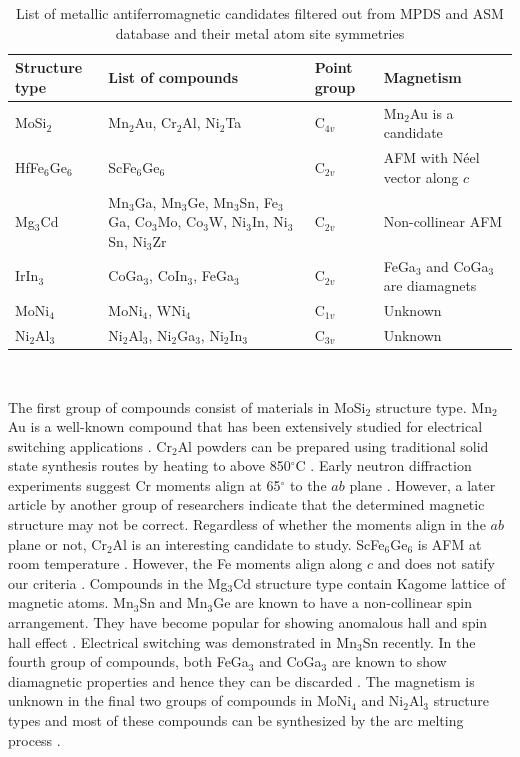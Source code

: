 \documentclass[11pt,edeposit,draftthesis]{uiucthesis2020}
\begin{document}
\begin{mainmatter}
\renewcommand{\arraystretch}{1.2}
\begin{table}
\caption{\label{tab:metallic_afm_candidates} 
List of metallic antiferromagnetic candidates filtered out from MPDS and ASM database and their metal atom site symmetries}
\centering
\begin{tabular}{>{\raggedright\arraybackslash}p{3cm}>{\raggedright\arraybackslash}p{4cm}>{\centering}p{3cm}>{\raggedright\arraybackslash}p{4cm}}
\hline\hline
\textbf{Structure type} & \textbf{List of compounds} & \textbf{Point group} & \textbf{Magnetism}\\
\hline
MoSi$_2$ & Mn$_2$Au, Cr$_2$Al, Ni$_2$Ta & C$_{4v}$ & Mn$_2$Au is a candidate\\
\hline
HfFe$_6$Ge$_6$ & ScFe$_6$Ge$_6$ & C$_{2v}$ & AFM with N\'eel vector along $c$\\
\hline
Mg$_3$Cd & Mn$_3$Ga, Mn$_3$Ge, Mn$_3$Sn, Fe$_3$Ga, Co$_3$Mo, Co$_3$W, Ni$_3$In, Ni$_3$Sn, Ni$_3$Zr & C$_{2v}$ & Non-collinear AFM\\
\hline
IrIn$_3$ & CoGa$_3$, CoIn$_3$, FeGa$_3$ & C$_{2v}$ & FeGa$_3$ and CoGa$_3$ are diamagnets\\
\hline
MoNi$_4$ & MoNi$_4$, WNi$_4$ & C$_{1v}$ & Unknown\\
\hline
Ni$_2$Al$_3$ & Ni$_2$Al$_3$, Ni$_2$Ga$_3$, Ni$_2$In$_3$ & C$_{3v}$ & Unknown\\
\hline\hline
\end{tabular}
~\\
\end{table}


The first group of compounds consist of materials in MoSi$_2$ structure type. Mn$_2$Au is a well-known compound that has been extensively studied for electrical switching applications \cite{Meinert2018,Bodnar2019}. Cr$_2$Al powders can be prepared using traditional solid state synthesis routes by heating to above 850$^\circ$C \cite{Susner2015}. Early neutron diffraction experiments suggest Cr moments align at 65$^\circ$ to the $ab$ plane \cite{Atoji1965}. However, a later article \cite{Kallel1967} by another group of researchers indicate that the determined magnetic structure may not be correct. Regardless of whether the moments align in the $ab$ plane or not, Cr$_2$Al is an interesting candidate to study. ScFe$_6$Ge$_6$ is AFM at room temperature \cite{Venturini1992}. However, the Fe moments align along $c$ and does not satify our criteria \cite{Mazet2000}. Compounds in the Mg$_3$Cd structure type contain Kagome lattice of magnetic atoms. Mn$_3$Sn and Mn$_3$Ge are known to have a non-collinear spin arrangement. They have become popular for showing anomalous hall and spin hall effect \cite{Nakatsuji2015,Kubler2014,Kimata2019}. Electrical switching was demonstrated in Mn$_3$Sn recently. In the fourth group of compounds, both FeGa$_3$ and CoGa$_3$ are known to show diamagnetic properties and hence they can be discarded \cite{Haussermann2002,Viklund2002,Zhang2017}. The magnetism is unknown in the final two groups of compounds in MoNi$_4$ and Ni$_2$Al$_3$ structure types and most of these compounds can be synthesized by the arc melting process \cite{Harker1944,Taylor1972}.


\end{mainmatter}
\end{document}
